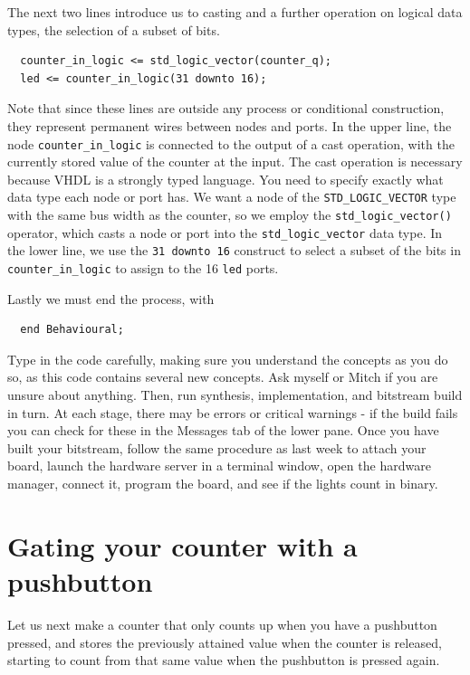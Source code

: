 \documentclass[../physical_computing.tex]{subfiles}
\begin{document}
The next two lines introduce us to casting and a further operation on logical data types, the selection of a subset of bits. 

\begin{verbatim}
  counter_in_logic <= std_logic_vector(counter_q);
  led <= counter_in_logic(31 downto 16);
\end{verbatim}

Note that since these lines are outside any process or conditional construction, they represent permanent wires between nodes and ports. In the upper line, the node \texttt{counter\_in\_logic} is connected to the output of a cast operation, with the currently stored value of the counter at the input. The cast operation is necessary because VHDL is a strongly typed language. You need to specify exactly what data type each node or port has. We want a node of the \texttt{STD\_LOGIC\_VECTOR} type with the same bus width as the 
counter, so we employ the \texttt{std\_logic\_vector()} operator, which casts a node or port into the \texttt{std\_logic\_vector} data type. In the lower line, we use the \texttt{31 downto 16} construct to select a subset of the bits in \texttt{counter\_in\_logic} to assign to the 16 \texttt{led} ports.

Lastly we must end the process, with 
\begin{verbatim}
  end Behavioural;
\end{verbatim}

Type in the code carefully, making sure you understand the concepts as you do so, as this code contains several new concepts. Ask myself or Mitch if you are unsure about anything. Then, run synthesis, implementation, and bitstream build in turn. At each stage, there may be errors or critical warnings - if the build fails you can check for these in the Messages tab of the lower pane. Once you have built your bitstream, follow the same procedure as last week to attach your board, launch the hardware server in a terminal window, open the hardware manager, connect it, program the board, and see if the lights count in binary.

\section{Gating your counter with a pushbutton}
\label{sec:buttons}

Let us next make a counter that only counts up when you have a pushbutton pressed, and stores the previously attained value when the counter is released, starting to count from that same value when the pushbutton is pressed again.
\end{document}
